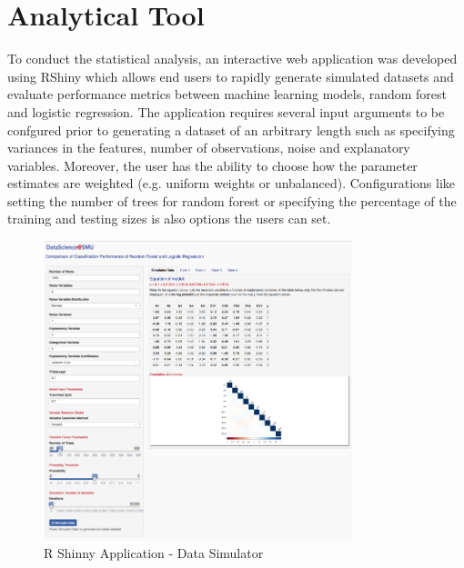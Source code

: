 \documentclass{llncs}
\begin{document}
\section{Analytical Tool}

To conduct the statistical analysis, an interactive web application was developed using RShiny which allows end users to rapidly generate simulated datasets and evaluate performance metrics between machine learning models, random forest and logistic regression. The application requires several input arguments to be confgured prior to generating a dataset of an arbitrary length such as specifying variances in the features, number of observations, noise and explanatory variables. Moreover, the user has the ability to choose how the parameter estimates are weighted (e.g. uniform weights or unbalanced). Configurations like setting the number of trees for random forest or specifying the percentage of the training and testing sizes is also options the users can set.

\begin{figure}
\centering
\includegraphics[width=0.8\textwidth]{rshiny.png}
\caption{R Shinny Application - Data Simulator}
\label{fig:rshiny}
\end{figure}
\end{document}
